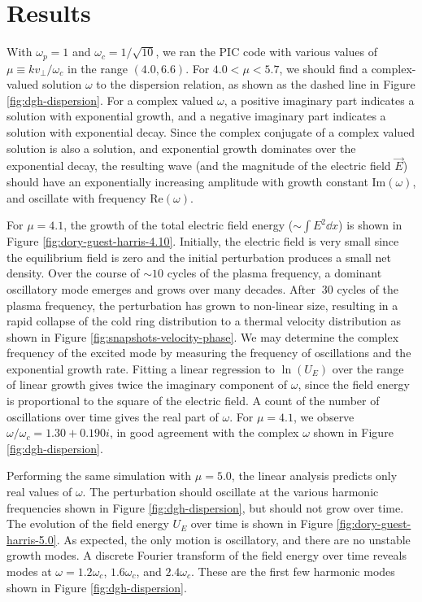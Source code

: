 \documentclass[%
 reprint,
 amsmath,amssymb,
 aps,
]{revtex4-2}
\begin{document}
\section{Results}

With $\omega_p = 1$ and $\omega_c = 1/\sqrt{10}$, we ran the PIC code with various values of $\mu \equiv k v_\perp / \omega_c$ in the range $(4.0, 6.6)$. For $4.0 < \mu < 5.7$, we should find a complex-valued solution $\omega$ to the dispersion relation, as shown as the dashed line in Figure \ref{fig:dgh-dispersion}. For a complex valued $\omega$, a positive imaginary part indicates a solution with exponential growth, and a negative imaginary part indicates a solution with exponential decay. Since the complex conjugate of a complex valued solution is also a solution, and exponential growth dominates over the exponential decay, the resulting wave (and the magnitude of the electric field $\vec E$) should have an exponentially increasing amplitude with growth constant $\text{Im}(\omega)$, and oscillate with frequency $\text{Re}(\omega)$.

For $\mu = 4.1$, the growth of the total electric field energy ($\sim \int E^2 \dd x$) is shown in Figure \ref{fig:dory-guest-harris-4.10}. Initially, the electric field is very small since the equilibrium field is zero and the initial perturbation produces a small net density. Over the course of $\sim 10$ cycles of the plasma frequency, a dominant oscillatory mode emerges and grows over many decades. After $~30$ cycles of the plasma frequency, the perturbation has grown to non-linear size, resulting in a rapid collapse of the cold ring distribution to a thermal velocity distribution as shown in Figure \ref{fig:snapshots-velocity-phase}. We may determine the complex frequency of the excited mode by measuring the frequency of oscillations and the exponential growth rate. Fitting a linear regression to $\ln(U_E)$ over the range of linear growth gives twice the imaginary component of $\omega$, since the field energy is proportional to the square of the electric field. A  count of the number of oscillations over time gives the real part of $\omega$. For $\mu = 4.1$, we observe $\omega / \omega_c = 1.30 + 0.190i$, in good agreement with the complex $\omega$ shown in Figure \ref{fig:dgh-dispersion}.

Performing the same simulation with $\mu = 5.0$, the linear analysis predicts only real values of $\omega$. The perturbation should oscillate at the various harmonic frequencies shown in Figure \ref{fig:dgh-dispersion}, but should not grow over time. The evolution of the field energy $U_E$ over time is shown in Figure \ref{fig:dory-guest-harris-5.0}. As expected, the only motion is oscillatory, and there are no unstable growth modes. A discrete Fourier transform of the field energy over time reveals modes at $\omega = 1.2 \omega_c$, $1.6 \omega_c$, and $2.4 \omega_c$. These are the first few harmonic modes shown in Figure \ref{fig:dgh-dispersion}.
\end{document}
